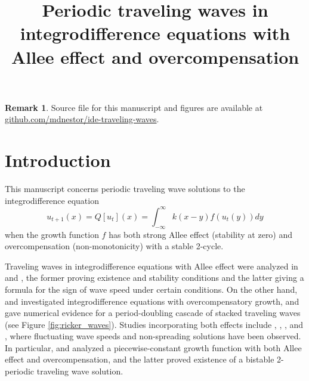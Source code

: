 \documentclass{article}
\title{Periodic traveling waves in integrodifference equations with Allee effect and overcompensation}
\theoremstyle{definition}
\newtheorem{remark}[theorem]{Remark}
\numberwithin{equation}{section}
\begin{document}
\maketitle


\begin{remark}
Source file for this manuscript and figures are available at \href{https://github.com/mdnestor/ide-traveling-waves}{github.com/mdnestor/ide-traveling-waves}.
\end{remark}

\section{Introduction}
This manuscript concerns periodic traveling wave solutions to the integrodifference equation
\begin{equation} \label{eqn:ide}
u_{t+1}(x) = Q[u_t](x) = \int_{-\infty}^{\infty} k(x-y) f(u_t(y)) dy
\end{equation}
when the growth function $f$ has both strong Allee effect (stability at zero) and overcompensation (non-monotonicity) with a stable 2-cycle.



Traveling waves in integrodifference equations with Allee effect were analyzed in \cite{lui1983} and \cite{wang2002}, the former proving existence and stability conditions and the latter giving a formula for the sign of wave speed under certain conditions.
On the other hand, \cite{kot1992} and \cite{bourgeois2020} investigated integrodifference equations with overcompensatory growth, and gave numerical evidence for a period-doubling cascade of stacked traveling waves (see Figure \ref{fig:ricker_waves}).
Studies incorporating both effects include \cite{sullivan2017}, \cite{otto2017}, \cite{otto2022}, and \cite{nestor2020}, where fluctuating wave speeds and non-spreading solutions have been observed.
In particular, \cite{otto2017} and \cite{nestor2020} analyzed a piecewise-constant growth function with both Allee effect and overcompensation, and the latter proved existence of a bistable 2-periodic traveling wave solution.
\end{document}
